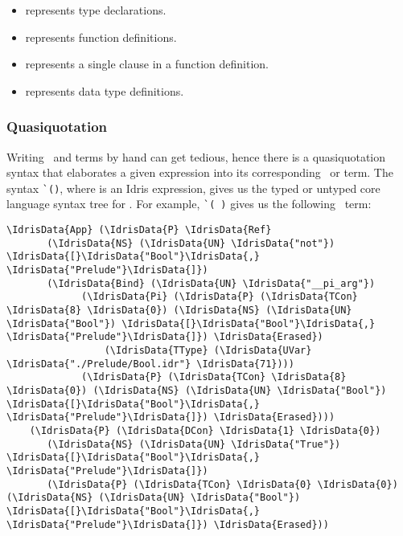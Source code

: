 \begin{itemize}
\item{} represents type declarations.
\item{} represents function definitions.
\item{} represents a single clause in a function definition.
\item{} represents data type definitions.
\end{itemize}

\subsubsection{Quasiquotation}

Writing \TT\ and  terms by hand can get tedious, hence there is a
quasiquotation syntax that elaborates a given expression into its corresponding
\TT\ or  term.\cite{idrisQuotation}
The syntax \verb|`(|\verb|)|, where  is an Idris expression, gives
us the typed or untyped core language syntax tree for . For example,
\verb|`(|\ \verb|)| gives us the following \TT\ term:
\begin{Verbatim}[framesep=2mm, label=\footnotesize{\normalfont{Idris}}, labelposition=topline]
\IdrisData{App} (\IdrisData{P} \IdrisData{Ref}
       (\IdrisData{NS} (\IdrisData{UN} \IdrisData{"not"}) \IdrisData{[}\IdrisData{"Bool"}\IdrisData{,} \IdrisData{"Prelude"}\IdrisData{]})
       (\IdrisData{Bind} (\IdrisData{UN} \IdrisData{"__pi_arg"})
             (\IdrisData{Pi} (\IdrisData{P} (\IdrisData{TCon} \IdrisData{8} \IdrisData{0}) (\IdrisData{NS} (\IdrisData{UN} \IdrisData{"Bool"}) \IdrisData{[}\IdrisData{"Bool"}\IdrisData{,} \IdrisData{"Prelude"}\IdrisData{]}) \IdrisData{Erased})
                 (\IdrisData{TType} (\IdrisData{UVar} \IdrisData{"./Prelude/Bool.idr"} \IdrisData{71})))
             (\IdrisData{P} (\IdrisData{TCon} \IdrisData{8} \IdrisData{0}) (\IdrisData{NS} (\IdrisData{UN} \IdrisData{"Bool"}) \IdrisData{[}\IdrisData{"Bool"}\IdrisData{,} \IdrisData{"Prelude"}\IdrisData{]}) \IdrisData{Erased})))
    (\IdrisData{P} (\IdrisData{DCon} \IdrisData{1} \IdrisData{0})
       (\IdrisData{NS} (\IdrisData{UN} \IdrisData{"True"}) \IdrisData{[}\IdrisData{"Bool"}\IdrisData{,} \IdrisData{"Prelude"}\IdrisData{]})
       (\IdrisData{P} (\IdrisData{TCon} \IdrisData{0} \IdrisData{0}) (\IdrisData{NS} (\IdrisData{UN} \IdrisData{"Bool"}) \IdrisData{[}\IdrisData{"Bool"}\IdrisData{,} \IdrisData{"Prelude"}\IdrisData{]}) \IdrisData{Erased}))
\end{Verbatim}

